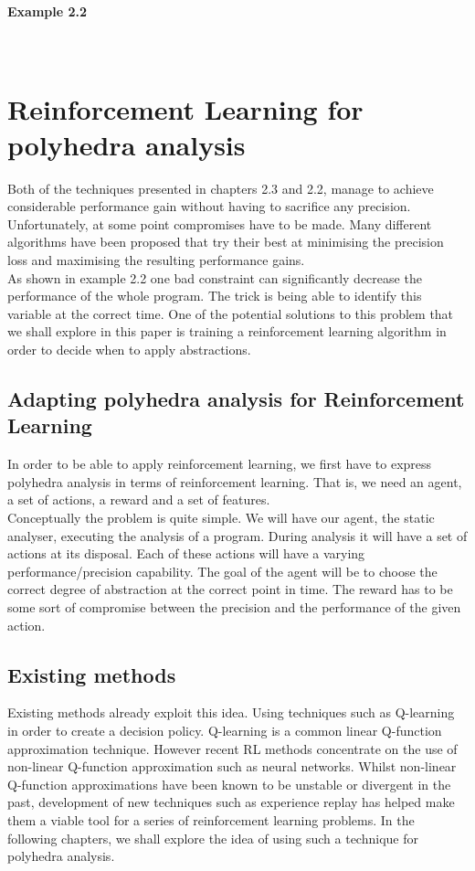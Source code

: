 \paragraph{Example 2.2} \mbox{}\\

\section{Reinforcement Learning for polyhedra analysis}
Both of the techniques presented in chapters 2.3 and 2.2, manage to achieve considerable performance gain without having to sacrifice any precision. Unfortunately, at some point compromises have to be made. Many different algorithms have been proposed that try their best at minimising the precision loss and maximising the resulting performance gains. \\
As shown in example 2.2 one bad constraint can significantly decrease the performance of the whole program. The trick is being able to identify this variable at the correct time. One of the potential solutions to this problem that we shall explore in this paper is training a reinforcement learning algorithm in order to decide when to apply abstractions.

\subsection{Adapting polyhedra analysis for Reinforcement Learning}

In order to be able to apply reinforcement learning, we first have to express polyhedra analysis in terms of reinforcement learning. That is, we need an agent, a set of actions, a reward and a set of features.\\
Conceptually the problem is quite simple. We will have our agent, the static analyser, executing the analysis of a program. During analysis it will have a set of actions at its disposal. Each of these actions will have a varying performance/precision capability. The goal of the agent will be to choose the correct degree of abstraction at the correct point in time. The reward has to be some sort of compromise between the precision and the performance of the given action.

\subsection{Existing methods}
Existing methods already exploit this idea. Using techniques such as Q-learning in order to create a decision policy. Q-learning is a common linear Q-function approximation technique. However recent RL methods concentrate on the use of non-linear Q-function approximation such as neural networks. Whilst non-linear Q-function approximations have been known to be unstable or divergent in the past, development of new techniques such as experience replay has helped make them a viable tool for a series of reinforcement learning problems. In the following chapters, we shall explore the idea of using such a technique for polyhedra analysis.